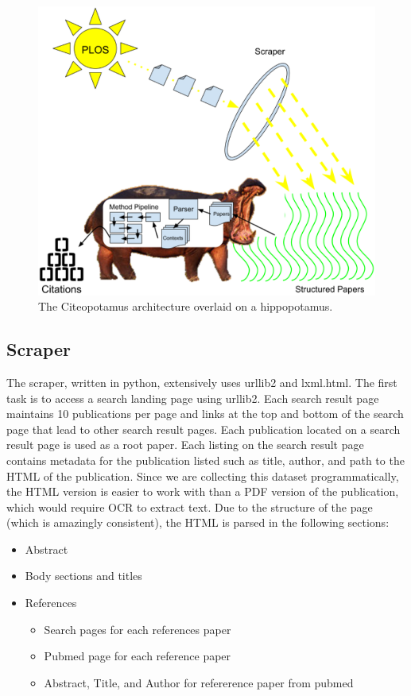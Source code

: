 \documentclass[10pt, conference, compsocconf]{IEEEtran}
\begin{document}
\begin{figure}[ht]
   \includegraphics[width=\textwidth]{images/arch.eps}
        \caption{The Citeopotamus architecture overlaid on a hippopotamus.}
        \label{fig:arch}
\end{figure}

\subsection{Scraper}
The scraper, written in python, extensively uses urllib2 and lxml.html. The
first task is to access a search landing page using urllib2. Each search result
page maintains 10 publications per page and links at the top
and bottom of the search page that lead to other search result pages. Each
publication located on a search result page is used as a root paper.
Each listing on the search result page contains metadata for the publication
listed such as title, author, and path to the HTML of the publication.
Since we are collecting this dataset programmatically, the HTML
version is easier to work with than a PDF version of the publication, which
would require OCR to extract text. Due to the structure of the page (which is
amazingly consistent), the HTML is parsed in the following sections:
\begin{itemize}
   \item Abstract
   \item Body sections and titles
   \item References
      \begin{itemize}
         \item Search pages for each references paper
         \item Pubmed page for each reference paper
         \item Abstract, Title, and Author for refererence paper from pubmed
      \end{itemize}
\end{itemize}
\end{document}
